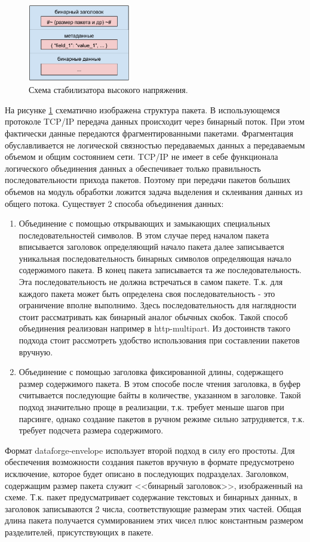 \documentclass[a4paper,14pt]{extreport}
\begin{document}
\begin{figure}
  \centering
  \includegraphics[width = 0.4\textwidth]{img/dataforge/message.pdf}
    \caption{Схема стабилизатора высокого напряжения.}
    \label{fig:datafoge-message}
\end{figure}

На рисунке \ref{fig:datafoge-message} схематично изображена структура пакета.
В использующемся протоколе TCP/IP передача данных происходит через бинарный поток. При этом фактически данные передаются фрагментированными пакетами. Фрагментация обуславливается не логической связностью передаваемых данных а передаваемым объемом и общим состоянием сети. TCP/IP не имеет в себе функционала логического объединения данных а обеспечивает только правильность последовательности прихода пакетов. Поэтому при передачи пакетов больших объемов на модуль обработки ложится задача выделения и склеивания данных из общего потока. Существует 2 способа объединения данных:
\begin{enumerate}
    \item Объединение с помощью открывающих и замыкающих специальных последовательностей символов. В этом случае перед началом пакета вписывается заголовок определяющий начало пакета далее записывается уникальная последовательность бинарных символов определяющая начало содержимого пакета. В конец пакета записывается та же последовательность. Эта последовательность не должна встречаться в самом пакете. Т.к. для каждого пакета может быть определена своя последовательность - это ограничение вполне выполнимо. Здесь последовательность для наглядности стоит рассматривать как бинарный аналог обычных скобок. Такой способ объединения реализован например в http-multipart. Из достоинств такого подхода стоит рассмотреть удобство использования при составлении пакетов вручную.
    \item Объединение с помощью заголовка фиксированной длины, содержащего размер содержимого пакета. В этом способе после чтения заголовка, в буфер считывается последующие байты в количестве, указанном в заголовке. Такой подход значительно проще в реализации, т.к. требует меньше шагов при парсинге, однако создание пакетов в ручном режиме сильно затрудняется, т.к. требует подсчета размера содержимого.
\end{enumerate}
Формат dataforge-envelope использует второй подход в силу его простоты. Для обеспечения возможности создания пакетов вручную в формате предусмотрено исключение, которое будет описано в последующих подразделах. Заголовком, содержащим размер пакета служит <<бинарный заголовок>>, изображенный на схеме. Т.к. пакет предусматривает содержание текстовых и бинарных данных, в заголовок записываются 2 числа, соответствующие размерам этих частей. Общая длина пакета получается суммированием этих чисел плюс константным размером разделителей, присутствующих в пакете.
\end{document}
